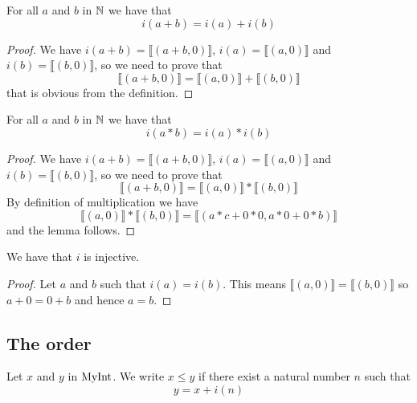 \begin{lemma}
    \label{MyInt.i_add}
    \leanok
For all $a$ and $b$ in $\mathbb{N}$ we have that
\[
i(a+b) = i(a) + i(b)
\]
\end{lemma}
\begin{proof}
    \leanok
    We have $i(a+b) = \llbracket (a+b, 0) \rrbracket$, $i(a) = \llbracket (a, 0) \rrbracket$ and
    $i(b) = \llbracket (b, 0) \rrbracket$, so we need to prove that
\[
\llbracket (a+b, 0) \rrbracket = \llbracket (a, 0) \rrbracket + \llbracket (b, 0) \rrbracket
\]
that is obvious from the definition.
\end{proof}

\begin{lemma}
    \label{MyInt.i_mul}
    \leanok
For all $a$ and $b$ in $\mathbb{N}$ we have that
\[
i(a*b) = i(a) * i(b)
\]
\end{lemma}
\begin{proof}
    \leanok
    We have $i(a+b) = \llbracket (a+b, 0) \rrbracket$, $i(a) = \llbracket (a, 0) \rrbracket$ and
    $i(b) = \llbracket (b, 0) \rrbracket$, so we need to prove that
\[
\llbracket (a+b, 0) \rrbracket = \llbracket (a, 0) \rrbracket * \llbracket (b, 0) \rrbracket
\]
By definition of multiplication we have
\[
\llbracket (a, 0) \rrbracket * \llbracket (b, 0) \rrbracket = \llbracket (a*c+0*0, a*0+0*b) \rrbracket
\]
and the lemma follows.
\end{proof}

\begin{lemma}
    \label{MyInt.i_injective}
    \leanok
    We have that $i$ is injective.
\end{lemma}
\begin{proof}
    \leanok
    Let $a$ and $b$ such that $i(a)=i(b)$. This means $\llbracket (a,0) \rrbracket = \llbracket (b,0) \rrbracket$ so $a + 0 = 0 + b$ and hence $a = b$.
\end{proof}

\subsection{The order}

\begin{definition}
    \label{MyInt.le}
    \leanok
Let $x$ and $y$ in $\mathrm{MyInt}$. We write $x \leq y$ if there exist a natural number $n$ such that
\[
y = x + i(n)
\]
\end{definition}

